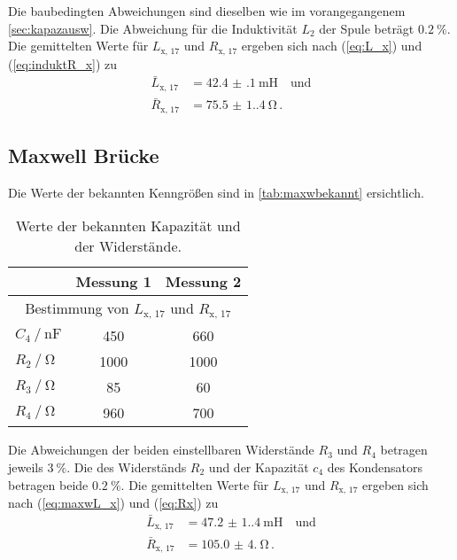 Die baubedingten Abweichungen sind dieselben wie im vorangegangenem \autoref{sec:kapazausw}.
Die Abweichung für die Induktivität $L_2$ der Spule beträgt $\qty{0.2}{\percent}$.
Die gemittelten Werte für $L_\text{x, 17}$ und $R_\text{x, 17}$ ergeben sich nach (\ref{eq:L_x}) und (\ref{eq:induktR_x}) zu
\begin{align*}
  \bar{L}_\text{x, 17} &= \qty{42.4(1)}{\milli\henry} \quad \text{und} \\
  \bar{R}_\text{x, 17} &= \qty{75.5(1.4)}{\ohm} \, .
\end{align*}

\subsection{Maxwell Brücke} \label{sec:maxwausw}

Die Werte der bekannten Kenngrößen sind in \autoref{tab:maxwbekannt} ersichtlich.
\begin{table}
  \centering
  \caption{Werte der bekannten Kapazität und der Widerstände.}
  \label{tab:maxwbekannt}
  \begin{tabular}{lcc}
    \toprule
     & Messung 1 & Messung 2  \\
    \midrule
    \multicolumn{3}{c}{ Bestimmung von $L_{\text{x, 17}}$ und $R_{\text{x, 17}}$ } \\
    $C_4 \mathbin{/} \unit{\nano\farad}$  &  450 &  660 \\
    $R_2 \mathbin{/} \unit{\ohm}$         & 1000 & 1000 \\
    $R_3 \mathbin{/} \unit{\ohm}$         &   85 &   60 \\
    $R_4 \mathbin{/} \unit{\ohm}$         &  960 &  700 \\
    \bottomrule
  \end{tabular}
\end{table}

Die Abweichungen der beiden einstellbaren Widerstände $R_3$ und $R_4$ betragen jeweils  $\qty{3}{\percent}$.
Die des Widerständs $R_2$ und der Kapazität $c_4$ des Kondensators betragen beide $\qty{0.2}{\percent}$.
Die gemittelten Werte für $L_\text{x, 17}$ und $R_\text{x, 17}$ ergeben sich nach (\ref{eq:maxwL_x}) und (\ref{eq:Rx}) zu
\begin{align*}
  \bar{L}_\text{x, 17} &= \qty{47.2(1.4)}{\milli\henry} \quad \text{und} \\
  \bar{R}_\text{x, 17} &= \qty{105.0(4.0)}{\ohm} \, .
\end{align*}


